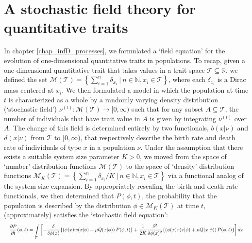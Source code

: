 \section{A stochastic field theory for quantitative traits}\label{sec_disc_field_eqns}

In chapter \ref{chap_infD_processes}, we formulated a `field equation' for the evolution of one-dimensional quantitative traits in populations. To recap, given a one-dimensional quantitative trait that takes values in a trait space $\mathcal{T} \subseteq \mathbb{R}$, we defined the set $\mathcal{M}(\mathcal{T}) =  \left\{\sum_{i=1}^{n}\delta_{x_i} \ | \ n \in \mathbb{N}, x_i \in \mathcal{T}\right\}$, where each $\delta_{x_i}$ is a Dirac mass centered at $x_i$. We then formulated a model in which the population at time $t$ is characterized as a whole by a randomly varying density distribution (`stochastic field') $\nu^{(t)}: \mathcal{M}(\mathcal{T}) \to [0,\infty)$ such that for any subset $A \subseteq \mathcal{T}$, the number of individuals that have trait value in $A$ is given by integrating $\nu^{(t)}$ over $A$. The change of this field is determined entirely by two functionals, $b(x|\nu)$ and $d(x|\nu)$ from $\mathcal{T}$ to $[0,\infty)$, that respectively describe the birth rate and death rate of individuals of type $x$ in a population $\nu$. Under the assumption that there exists a suitable system size parameter $K > 0$, we moved from the space of `number' distribution functions $\mathcal{M}(
\mathcal{T})$ to the space of `density' distribution functions $\mathcal{M}_{K}(\mathcal{T}) =  \left\{\sum_{i=1}^{n}\delta_{x_i}/K \ | \ n \in \mathbb{N}, x_i \in \mathcal{T}\right\}$ via a functional analog of the system size expansion. By appropriately rescaling the birth and death rate functionals, we then determined that $P(\phi,t)$, the probability that the population is described by the distribution $\phi \in \mathcal{M}_{K}(\mathcal{T})$ at time $t$, (approximately) satisfies the `stochastic field equation':
\begin{equation}
\label{disc_functional_field_eqns}
\resizebox{\textwidth}{!}{$\displaystyle
\frac{\partial P}{\partial t}(\phi,t) = \int\limits_{\mathcal{T}}\left[-
\frac{\delta}{\delta\phi(x)} \{ \left(\phi(x) w(x|\phi) + \mu Q(x|\phi)\right) P(\phi,t) \} + \frac{1}{2K}\frac{\delta^2}{\delta\phi(x)^2}\{\left(\phi(x) \tau(x|\phi) + \mu Q(x|\phi)\right)P(\phi,t)\}\right]dx$}
\end{equation}
